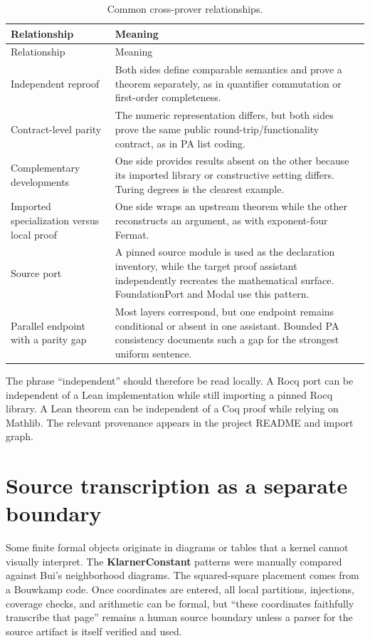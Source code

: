 \documentclass[
  10pt,
  a4paper,
  twoside,
  open=any,
  parskip=half,
  headings=big
]{scrreprt}
\newcommand{\project}[1]{\textsf{\bfseries #1}}
\begin{document}
\begin{longtable}{L{.25\textwidth}L{.64\textwidth}}
\caption{Common cross-prover relationships.}
\label{tab:cross-prover}\\
\toprule
Relationship & Meaning \\
\midrule
\endfirsthead
\toprule
Relationship & Meaning \\
\midrule
\endhead
Independent reproof &
Both sides define comparable semantics and prove a theorem separately, as in
quantifier commutation or first-order completeness.\\
Contract-level parity &
The numeric representation differs, but both sides prove the same public
round-trip/functionality contract, as in PA list coding.\\
Complementary developments &
One side provides results absent on the other because its imported library or
constructive setting differs.  Turing degrees is the clearest example.\\
Imported specialization versus local proof &
One side wraps an upstream theorem while the other reconstructs an argument,
as with exponent-four Fermat.\\
Source port &
A pinned source module is used as the declaration inventory, while the target
proof assistant independently recreates the mathematical surface.
FoundationPort and Modal use this pattern.\\
Parallel endpoint with a parity gap &
Most layers correspond, but one endpoint remains conditional or absent in one
assistant.  Bounded PA consistency documents such a gap for the strongest
uniform sentence.\\
\bottomrule
\end{longtable}

The phrase ``independent'' should therefore be read locally.  A Rocq port can
be independent of a Lean implementation while still importing a pinned Rocq
library.  A Lean theorem can be independent of a Coq proof while relying on
Mathlib.  The relevant provenance appears in the project README and import
graph.

\section{Source transcription as a separate boundary}

Some finite formal objects originate in diagrams or tables that a kernel
cannot visually interpret.  The \project{KlarnerConstant} patterns were
manually compared against Bui's neighborhood diagrams.  The squared-square
placement comes from a Bouwkamp code.  Once coordinates are entered, all local
partitions, injections, coverage checks, and arithmetic can be formal, but
``these coordinates faithfully transcribe that page'' remains a human source
boundary unless a parser for the source artifact is itself verified and used.
\end{document}
